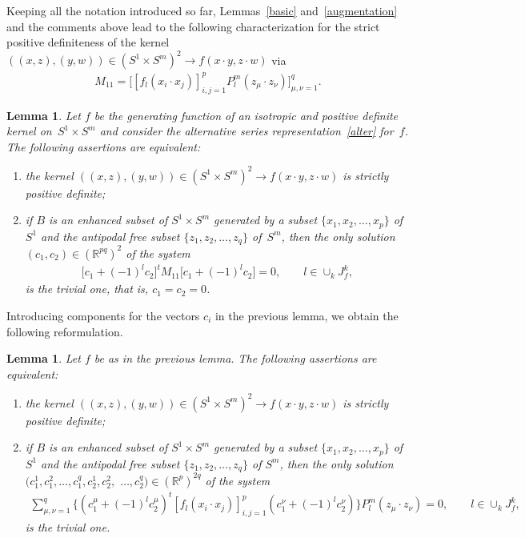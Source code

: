 \documentclass[11pt]{article}
\numberwithin{equation}{section}
\newtheorem{Lemma}[Theorem]{Lemma}
\begin{document}
Keeping all the notation introduced so far, Lemmas~\ref{basic} and~\ref{augmentation} and the comments above lead to the following characterization for the strict positive def\/initeness of the kernel $((x,z), (y,w)) \in (S^1 \times S^m)^2 \to f(x \cdot y, z \cdot w)$ via
\begin{gather*}M_{11}=\big[ [f_l(x_i \cdot x_j) ]_{i,j=1}^p P_l^m(z_\mu \cdot z_\nu)\big]_{\mu,\nu=1}^q.\end{gather*}
\begin{Lemma}
Let $f$ be the generating function of an isotropic and positive definite kernel on~\mbox{$S^1 \times S^m$} and consider the alternative series representation~\eqref{alter} for~$f$. The following assertions are equivalent:
\begin{enumerate}\itemsep=0pt
\item[$(i)$] the kernel $((x,z), (y,w)) \in (S^1 \times S^m)^2 \to f(x \cdot y, z \cdot w)$ is strictly positive definite;
\item[$(ii)$] if $B$ is an enhanced subset of $S^1 \times S^m$ generated by a subset $\{x_1,x_2, \ldots, x_p\}$ of~$S^1$ and the antipodal free subset $\{z_1, z_2,\ldots, z_q\}$ of~$S^m$, then the only solution $(c_1, c_2) \in (\mathbb{R}^{pq})^2$ of the system
\begin{gather*}\big[c_1+(-1)^l c_2\big]^tM_{11}\big[c_1+(-1)^lc_2\big]=0,\qquad l\in \cup_{k}J_f^k,\end{gather*}
is the trivial one, that is, $c_1=c_2=0$.
\end{enumerate}
\end{Lemma}

Introducing components for the vectors $c_i$ in the previous lemma, we obtain the following reformulation.

\begin{Lemma} \label{enhanced}
Let $f$ be as in the previous lemma. The following assertions are equivalent:
\begin{enumerate}\itemsep=0pt
\item[$(i)$] the kernel $((x,z), (y,w)) \in (S^1 \times S^m)^2 \to f(x \cdot y, z \cdot w)$ is strictly positive definite;
\item[$(ii)$] if $B$ is an enhanced subset of $S^1 \times S^m$ generated by a subset $\{x_1,x_2, \ldots, x_p\}$ of $S^1$ and the antipodal free subset $\{z_1, z_2,\ldots, z_q\}$ of $S^m$, then the only solution $(c_1^1, c_1^2, \ldots, c_1^q,c_2^1, c_2^2,$ $ \ldots, c_2^q) \in (\mathbb{R}^{p})^{2q}$ of the system
\begin{gather*}\sum_{\mu,\nu=1}^q \big\{(c_1^\mu+(-1)^l c_2^\mu)^t [f_l(x_i \cdot x_j) ]_{i,j=1}^p (c_1^\nu +(-1)^l c_2^\nu)\big\} P_l^m(z_\mu \cdot z_\nu)=0,\qquad l\in \cup_{k}J_f^k,
\end{gather*}
is the trivial one.
\end{enumerate}
\end{Lemma}
\end{document}
